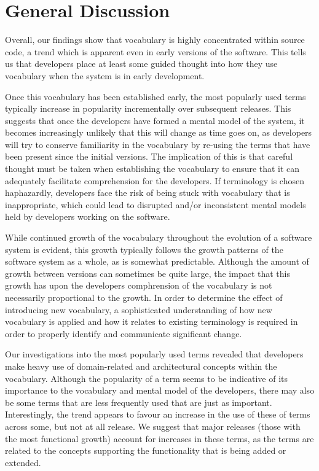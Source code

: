 \section{General Discussion} %
\label{sec:general_discussion}

Overall, our findings show that vocabulary is highly concentrated within source code, a trend which is apparent even in early versions of the software. This tells us that developers place at least some guided thought into how they use vocabulary when the system is in early development. 

Once this vocabulary has been established early, the most popularly used terms typically increase in popularity incrementally over subsequent releases. This suggests that once the developers have formed a mental model of the system, it becomes increasingly unlikely that this will change as time goes on, as developers will try to conserve familiarity in the vocabulary by re-using the terms that have been present since the initial versions. The implication of this is that careful thought must be taken when establishing the vocabulary to ensure that it can adequately facilitate comprehension for the developers. If terminology is chosen haphazardly, developers face the risk of being stuck with vocabulary that is inappropriate, which could lead to disrupted and/or inconsistent mental models held by developers working on the software.

While continued growth of the vocabulary throughout the evolution of a software system is evident, this growth typically follows the growth patterns of the software system as a whole, as is somewhat predictable. Although the amount of growth between versions can sometimes be quite large, the impact that this growth has upon the developers comphrension of the vocabulary is not necessarily proportional to the growth. In order to determine the effect of introducing new vocabulary, a sophisticated understanding of how new vocabulary is applied and how it relates to existing terminology is required in order to properly identify and communicate significant change.

Our investigations into the most popularly used terms revealed that developers make heavy use of domain-related and architectural concepts within the vocabulary. Although the popularity of a term seems to be indicative of its importance to the vocabulary and mental model of the developers, there may also be some terms that are less frequently used that are just as important. Interestingly, the trend appears to favour an increase in the use of these of terms across some, but not at all release. We suggest that major releases (\ie those with the most functional growth) account for increases in these terms, as the terms are related to the concepts supporting the functionality that is being added or extended.


